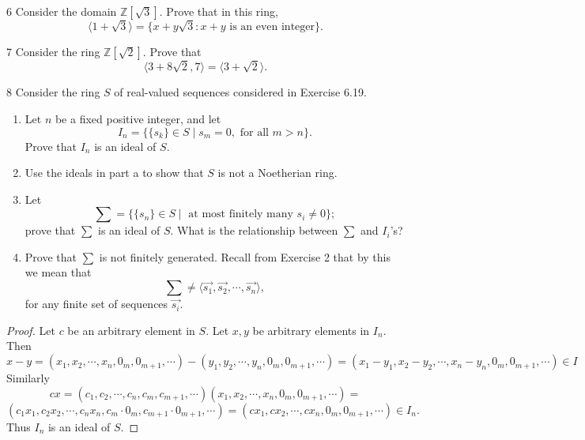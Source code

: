 \begin{problem}{6}
    Consider the domain $\mathbb{Z}[\sqrt{3}]$. Prove that in this ring,
    \[\langle 1 + \sqrt{3} \rangle = \{x + y\sqrt{3} : x + y \text{ is an even integer}\}.\]
\end{problem}
\unsolved

\begin{problem}{7}
    Consider the ring $\mathbb{Z}[\sqrt{2}]$. Prove that
    \[\langle 3 + 8\sqrt{2}, 7 \rangle = \langle 3 + \sqrt{2} \rangle.\]
\end{problem}
\unsolved

\begin{problem}{8}
    Consider the ring $S$ of real-valued sequences considered in Exercise 6.19.
    \begin{enumerate}
        \item Let $n$ be a fixed positive integer, and let 
        \[I_n = \{\{s_k\} \in S \mid s_m = 0, \text{ for all } m > n\}.\]
        Prove that $I_n$ is an ideal of $S$.
        \item Use the ideals in part a to show that $S$ is not a Noetherian ring.
        \item Let 
        \[\sum = \{\{s_n\} \in S \mid \text{ at most finitely many $s_i \ne 0$}\};\]
        prove that $\sum$ is an ideal of $S$. What is the relationship between $\sum$ and $I_i$'s?
        \item Prove that $\sum$ is not finitely generated. Recall from Exercise 2 that by this we mean that 
        \[\sum \ne \langle \vec{s_1}, \vec{s_2}, \cdots, \vec{s_n} \rangle,\]
        for any finite set of sequences $\vec{s_i}$.
    \end{enumerate}
\end{problem}
\solved

\begin{proof}
    Let $c$ be an arbitrary element in $S$.
    Let $x, y$ be arbitrary elements in $I_n$.
    Then 
    \[x - y = (x_1, x_2, \cdots, x_n, 0_m, 0_{m + 1}, \cdots) - (y_1, y_2, \cdots, y_n, 0_m, 0_{m + 1}, \cdots) = (x_1 - y_1, x_2 - y_2, \cdots, x_n - y_n, 0_m, 0_{m + 1}, \cdots) \in I\]
    Similarly
    \[cx = (c_1, c_2, \cdots, c_n, c_m, c_{m + 1}, \cdots)(x_1, x_2, \cdots, x_n, 0_m, 0_{m + 1}, \cdots) =\] 
    \[(c_1 x_1, c_2 x_2, \cdots, c_n x_n, c_m \cdot 0_m, c_{m + 1} \cdot 0_{m + 1}, \cdots) = (c x_1, c x_2, \cdots, c x_n, 0_m, 0_{m + 1}, \cdots) \in I_n.\]
    Thus $I_n$ is an ideal of $S$.
\end{proof}

